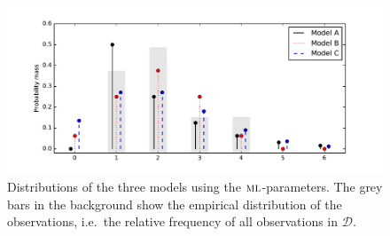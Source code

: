 \documentclass[a4paper,10pt,landscape,twocolumn]{scrartcl}
\newcommand{\philip}[1]{\textcolor{red}{[Phil: #1]}}
\begin{document}
%	
%	
%	
%	

\begin{figure}
	\includegraphics[width=.5\textwidth]{media/05-distributions}
	\caption{Distributions of the three models using the $\textsc{ml}$-parameters. The grey bars in the background show the empirical distribution of the observations, i.e.\ the relative frequency of all observations in $\mathcal{D}$.\label{fig:models}}
\end{figure}
\end{document}
